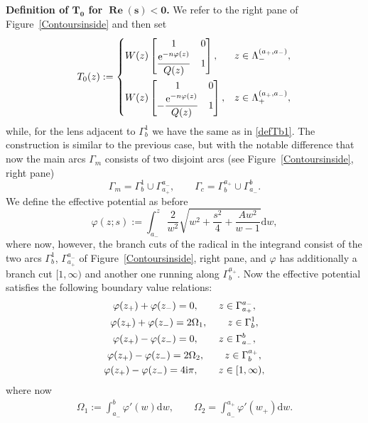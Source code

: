 \documentclass[pdftex]{sigma}
\numberwithin{equation}{section}
\theoremstyle{definition}
\def \ds{\displaystyle}
\def \d{{\mathrm d}}
\def\nn{\nonumber}
\def \Re{\operatorname{Re} }
\begin{document}
{\bf Definition of $\boldsymbol{T_0}$ for $\boldsymbol{\Re(s)<0}$.}
We refer to the right pane of Figure~\ref{Contoursinside} and then set
\begin{gather*}%
T_0(z):=
\begin{cases}
\ds W(z) \begin{bmatrix}
1 & 0 \\
\displaystyle \frac{ {\rm e}^{-n\varphi(z)}}{ Q(z)} & 1
\end{bmatrix},& z\in \Lambda_-^{(a_+,a_-)},
\vspace{1mm}\\
W(z) \begin{bmatrix}
1 & 0 \\
\displaystyle-\frac{ {\rm e}^{-n\varphi(z)}}{ Q(z)} & 1
\end{bmatrix}, & z\in \Lambda_+^{(a_+,a_-)},
\end{cases}
\end{gather*}
while, for the lens  adjacent to $\Gamma_b^1$ we have the same as in \eqref{defTb1}.
 The construction is similar to the previous case, but with the notable difference that now the main arcs $\Gamma_m$ consists of two disjoint arcs (see Figure~\ref{Contoursinside}, right pane)
\[
\Gamma_m = \Gamma_{b}^1 \cup \Gamma_{a_+}^{a_-}, \qquad
 \Gamma_c = \Gamma_b^{a_+} \cup \Gamma_{a_-}^b.
 \]
 We define the effective potential as before
 \[
 \varphi(z;s) := \int_{a_-}^z \frac 2 {w^2} \sqrt{w^2 + \frac {s^2}4 + \frac {Aw^2}{w-1}}\d w,
 \]
 where now, however, the branch cuts of the radical in the integrand consist of the two arcs $\Gamma_{b}^1 $, $ \Gamma_{a_+}^{a_-}$ of Figure~\ref{Contoursinside}, right pane, and $\varphi$ has additionally a branch cut $[1,\infty)$ and another one running along $\Gamma_b^{a_+}$.
 Now the effective potential satisfies the following boundary value relations:
 \begin{gather*}
\varphi(z_+)+\varphi(z_-) = 0, \qquad z\in \Gamma_{a_+}^{a_-},
\\
\varphi(z_+)+\varphi(z_-) = 2\Omega_1, \qquad z\in \Gamma_{b}^{1},
\nn
\\
\varphi(z_+)-\varphi(z_-) = 0, \qquad z\in \Gamma_{a_-}^{b},
\\
 \varphi(z_+)-\varphi(z_-) = 2\Omega_2, \qquad z\in \Gamma^{a_+}_{b},
\\
 \varphi(z_+)-\varphi(z_-) = 4{\rm i}\pi, \qquad z\in [1,\infty),
 \end{gather*}
 where now
 \begin{gather}
 \label{defOmega12bis}
 \Omega_1:= \int_{a_-}^b \varphi'(w)\d w,\qquad \Omega_2 = \int_{a_-}^{a_+} \varphi'(w_+)\d w.
 \end{gather}
\end{document}

